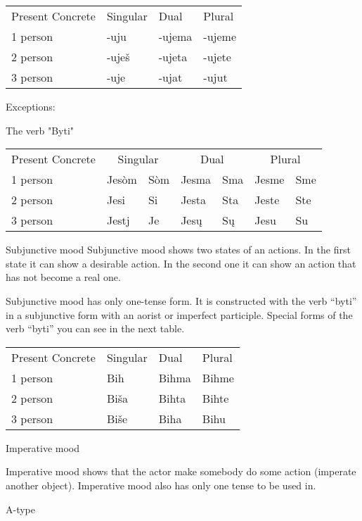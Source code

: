 \begin{table}
	\begin{tabular}{llll}
		Present Concrete & Singular & Dual & Plural \\
		1 person & -uju & -ujema & -ujeme \\
		2 person & -uješ & -ujeta & -ujete \\
		3 person & -uje & -ujat & -ujut
	\end{tabular}
\end{table}


Exceptions:

The verb "Byti"

\begin{table}
	\begin{tabular}{lllllll}
		Present Concrete
			& \multicolumn{2}{c}{Singular}
			 & \multicolumn{2}{c}{Dual}
			 & \multicolumn{2}{c}{Plural} \\
		1 person & Jesòm & Sòm & Jesma & Sma & Jesme & Sme \\
		2 person & Jesi & Si & Jesta & Sta & Jeste & Ste \\
		3 person & Jestj & Je & Jesų & Sų & Jesu & Su
	\end{tabular}
\end{table}


Subjunctive mood
Subjunctive mood shows two states of an actions. In the first state it can show a desirable action. In the second one it can show an action that has not become a real one. 

Subjunctive mood has only one-tense form. It is constructed with the verb “byti” in a subjunctive form with an aorist or imperfect participle. Special forms of the verb “byti” you can see in the next table.

\begin{table}
	\begin{tabular}{llll}
		Present Concrete & Singular & Dual & Plural \\
		1 person & Bih & Bihma & Bihme \\
		2 person & Biša & Bihta & Bihte \\
		3 person & Biše & Biha & Bihu
	\end{tabular}
\end{table}

Imperative mood

Imperative mood shows that the actor make somebody do some action (imperate another object). Imperative mood also has only one tense to be used in. 

A-type

